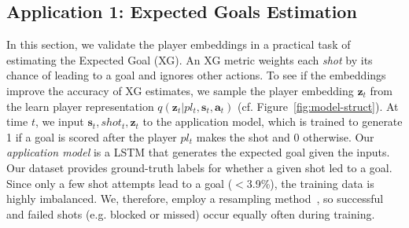 \documentclass{article}
\newcommand{\latentvariables}{\mathbf{z}}
\newcommand{\inference}{q}
\newcommand{\state}{\mathbf{s}}
\newcommand{\action}{\mathbf{a}}
\newcommand{\player}{pl}
\begin{document}
\subsection{Application 1: Expected Goals Estimation}\label{subsec:expected-goal}

In this section, we validate the player embeddings in a practical task of estimating the Expected Goal (XG). 
An XG metric weights each {\it shot} by its chance of leading to a goal and ignores other actions. To see if the embeddings improve the accuracy of XG estimates, we sample the player embedding $\latentvariables_{t}$ from the learn player representation $\inference(\latentvariables_{t} |\player_{t} ,\state_{t},\action_{t})$ (cf. Figure~\ref{fig:model-struct}). 
At time $t$, we 
input $\state_{t},shot_{t},\latentvariables_{t}$ to the application model, which is trained to generate 1 if a goal is scored after the player $\player_{t}$ makes the shot and 0 otherwise. Our {\em application model} is a LSTM that generates the expected goal given the inputs. Our dataset provides ground-truth labels for whether a given shot led to a goal. 
Since only a few shot attempts lead to a goal ($<$3.9\%), the training data is highly imbalanced.
We, therefore, employ a resampling method~\cite{good2006resampling}, so successful and failed shots (e.g. blocked or missed) occur equally often during training.
\end{document}
